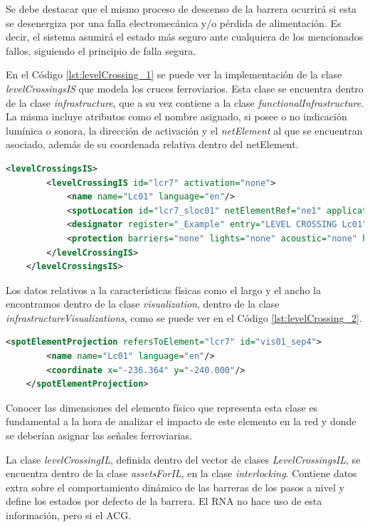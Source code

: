     Se debe destacar que el mismo proceso de descenso de la barrera ocurrirá si esta se desenergiza por una falla electromecánica y/o pérdida de alimentación. Es decir, el sistema asumirá el estado más seguro ante cualquiera de los mencionados fallos, siguiendo el principio de falla segura.

    En el Código \ref{lst:levelCrossing_1} se puede ver la implementación de la clase \textit{levelCrossingsIS} que modela los cruces ferroviarios. Esta clase se encuentra dentro de la clase \textit{infrastructure}, que a su vez contiene a la clase \textit{functionalInfrastructure}. La misma incluye atributos como el nombre asignado, si posee o no indicación lumínica o sonora, la dirección de activación y el \textit{netElement} al que se encuentran asociado, además de su coordenada relativa dentro del netElement.

    \begin{lstlisting}[language = XML, caption = Clase \textit{LevelCrossingsIS} , label = {lst:levelCrossing_1}]
    <levelCrossingsIS>
        <levelCrossingIS id="lcr7" activation="none">
            <name name="Lc01" language="en"/>
            <spotLocation id="lcr7_sloc01" netElementRef="ne1" applicationDirection="both" intrinsicCoord="0.3145"/>
            <designator register="_Example" entry="LEVEL CROSSING Lc01"/>
            <protection barriers="none" lights="none" acoustic="none" hasActiveProtection="true"/>
        </levelCrossingIS>
    </levelCrossingsIS>
    \end{lstlisting}

	Los datos relativos a la características físicas como el largo y el ancho la encontramos dentro de la clase \textit{visualization}, dentro de la clase \textit{infrastructureVisualizations}, como se puede ver en el Código \ref{lst:levelCrossing_2}.
	
    \begin{lstlisting}[language = XML, caption = Clase \textit{Visualization} , label = {lst:levelCrossing_2}]
    <spotElementProjection refersToElement="lcr7" id="vis01_sep4">
        <name name="Lc01" language="en"/>
        <coordinate x="-236.364" y="-240.000"/>
    </spotElementProjection>
    \end{lstlisting}

    Conocer las dimensiones del elemento físico que representa esta clase es fundamental a la hora de analizar el impacto de este elemento en la red y donde se deberían asignar las señales ferroviarias.
    
    La clase \textit{levelCrossingIL}, definida dentro del vector de clases \textit{LevelCrossingsIL}, se encuentra dentro de la clase \textit{assetsForIL}, en la clase \textit{interlocking}. Contiene datos extra sobre el comportamiento dinámico de las barreras de los pasos a nivel y define los estados por defecto de la barrera. El RNA no hace uso de esta información, pero si el ACG.
    
